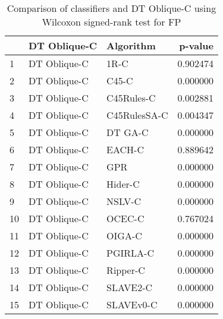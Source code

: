 \begin{table}
\footnotesize
\caption{Comparison of classifiers and DT Oblique-C using Wilcoxon signed-rank test for FP}
\label{tab:DT Oblique-C wilcoxon FP comparison}
\begin{tabular}{lllr}
\hline
 & DT Oblique-C & Algorithm & p-value \\
\hline
1 & DT Oblique-C & 1R-C & 0.902474 \\
2 & DT Oblique-C & C45-C & 0.000000 \\
3 & DT Oblique-C & C45Rules-C & 0.002881 \\
4 & DT Oblique-C & C45RulesSA-C & 0.004347 \\
5 & DT Oblique-C & DT GA-C & 0.000000 \\
6 & DT Oblique-C & EACH-C & 0.889642 \\
7 & DT Oblique-C & GPR & 0.000000 \\
8 & DT Oblique-C & Hider-C & 0.000000 \\
9 & DT Oblique-C & NSLV-C & 0.000000 \\
10 & DT Oblique-C & OCEC-C & 0.767024 \\
11 & DT Oblique-C & OIGA-C & 0.000000 \\
12 & DT Oblique-C & PGIRLA-C & 0.000000 \\
13 & DT Oblique-C & Ripper-C & 0.000000 \\
14 & DT Oblique-C & SLAVE2-C & 0.000000 \\
15 & DT Oblique-C & SLAVEv0-C & 0.000000 \\
\hline
\end{tabular}
\end{table}
